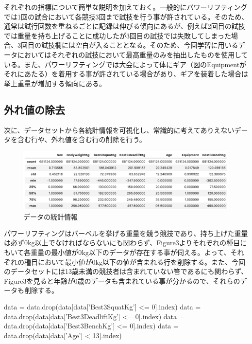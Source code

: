 \documentclass{article}
\begin{document}
それぞれの指標について簡単な説明を加えておく。一般的にパワーリフティングでは1回の試合において各競技3回まで試技を行う事が許されている。そのため、通常は試行回数を重ねるごとに記録は伸びる傾向にあるが、例えば2回目の試技では重量を持ち上げることに成功したが3回目の試技では失敗してしまった場合、3回目の試技欄には空白が入ることとなる。そのため、今回学習に用いるデータにおいてはそれぞれの試技において最高重量のみを抽出したものを使用している。また、パワーリフティングでは大会によって体にギア（図のEquipmentがそれにあたる）を着用する事が許されている場合があり、ギアを装着した場合は挙上重量が増加する傾向にある。

\subsection{外れ値の除去}

次に、データセットから各統計情報を可視化し、常識的に考えてありえないデータを含む行や、外れ値を含む行の削除を行う。
\\

\begin{figure}[H]
\begin{center}
\includegraphics[width=\linewidth]{data_stats.png}
\caption{データの統計情報}
\end{center}
\end{figure}

パワーリフティングはバーベルを挙げる重量を競う競技であり、持ち上げた重量は必ず0kg以上でなければならないにも関わらず、Figure3よりそれぞれの種目にもいて各重量の最小値が0kg以下のデータが存在する事が伺える。よって、それぞれの種目において最小値が0kg以下の値が含まれる行を削除する。また、今回のデータセットには13歳未満の競技者は含まれていない筈であるにも関わらず、Figure3を見ると年齢が0歳のデータも含まれている事が分かるので、それらのデータも削除する。


\begin{python}[caption=0kg以下の重量、13歳未満の年齢を含む行の削除]
data = data.drop(data[data['Best3SquatKg'] <= 0].index)
data = data.drop(data[data['Best3DeadliftKg'] <= 0].index)
data = data.drop(data[data['Best3BenchKg'] <= 0].index)
data = data.drop(data[data['Age'] < 13].index)
\end{python}
\end{document}

